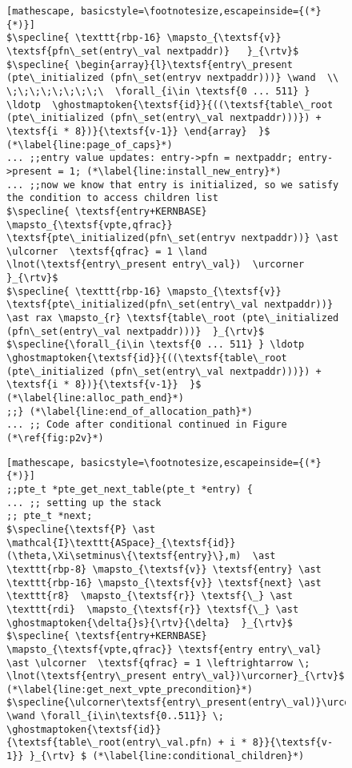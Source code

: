 \begin{figure}
\begin{lstlisting}[mathescape, basicstyle=\footnotesize,escapeinside={(*}{*)}]
$\specline{ \texttt{rbp-16} \mapsto_{\textsf{v}} \textsf{pfn\_set(entry\_val nextpaddr)}   }_{\rtv}$
$\specline{ \begin{array}{l}\textsf{entry\_present (pte\_initialized (pfn\_set(entryv nextpaddr)))} \wand  \\ \;\;\;\;\;\;\;\;\  \forall_{i\in \textsf{0 ... 511} } \ldotp  \ghostmaptoken{\textsf{id}}{((\textsf{table\_root (pte\_initialized (pfn\_set(entry\_val nextpaddr)))}) + \textsf{i * 8})}{\textsf{v-1}} \end{array}  }$ (*\label{line:page_of_caps}*)
... ;;entry value updates: entry->pfn = nextpaddr; entry->present = 1; (*\label{line:install_new_entry}*)
... ;;now we know that entry is initialized, so we satisfy the condition to access children list
$\specline{ \textsf{entry+KERNBASE} \mapsto_{\textsf{vpte,qfrac}}  \textsf{pte\_initialized(pfn\_set(entryv nextpaddr))} \ast \ulcorner  \textsf{qfrac} = 1 \land \lnot(\textsf{entry\_present entry\_val})  \urcorner }_{\rtv}$
$\specline{ \texttt{rbp-16} \mapsto_{\textsf{v}} \textsf{pte\_initialized(pfn\_set(entry\_val nextpaddr))}  \ast rax \mapsto_{r} \textsf{table\_root (pte\_initialized (pfn\_set(entry\_val nextpaddr)))}  }_{\rtv}$
$\specline{\forall_{i\in \textsf{0 ... 511} } \ldotp  \ghostmaptoken{\textsf{id}}{((\textsf{table\_root (pte\_initialized (pfn\_set(entry\_val nextpaddr)))}) + \textsf{i * 8})}{\textsf{v-1}}  }$ (*\label{line:alloc_path_end}*)
;;} (*\label{line:end_of_allocation_path}*)
... ;; Code after conditional continued in Figure (*\ref{fig:p2v}*)
\end{lstlisting}
\else
\begin{lstlisting}[mathescape, basicstyle=\footnotesize,escapeinside={(*}{*)}]
;;pte_t *pte_get_next_table(pte_t *entry) {
... ;; setting up the stack
;; pte_t *next;
$\specline{\textsf{P} \ast \mathcal{I}\texttt{ASpace}_{\textsf{id}}(\theta,\Xi\setminus\{\textsf{entry}\},m)  \ast \texttt{rbp-8} \mapsto_{\textsf{v}} \textsf{entry} \ast  \texttt{rbp-16} \mapsto_{\textsf{v}} \textsf{next} \ast \texttt{r8}  \mapsto_{\textsf{r}} \textsf{\_} \ast \texttt{rdi}  \mapsto_{\textsf{r}} \textsf{\_} \ast \ghostmaptoken{\delta{}s}{\rtv}{\delta}  }_{\rtv}$
$\specline{ \textsf{entry+KERNBASE} \mapsto_{\textsf{vpte,qfrac}} \textsf{entry entry\_val} \ast \ulcorner  \textsf{qfrac} = 1 \leftrightarrow \; \lnot(\textsf{entry\_present entry\_val})\urcorner}_{\rtv}$ (*\label{line:get_next_vpte_precondition}*)
$\specline{\ulcorner\textsf{entry\_present(entry\_val)}\urcorner \wand \forall_{i\in\textsf{0..511}} \; \ghostmaptoken{\textsf{id}}{\textsf{table\_root(entry\_val.pfn) + i * 8}}{\textsf{v-1}} }_{\rtv} $ (*\label{line:conditional_children}*)

\end{lstlisting}
\end{figure}
